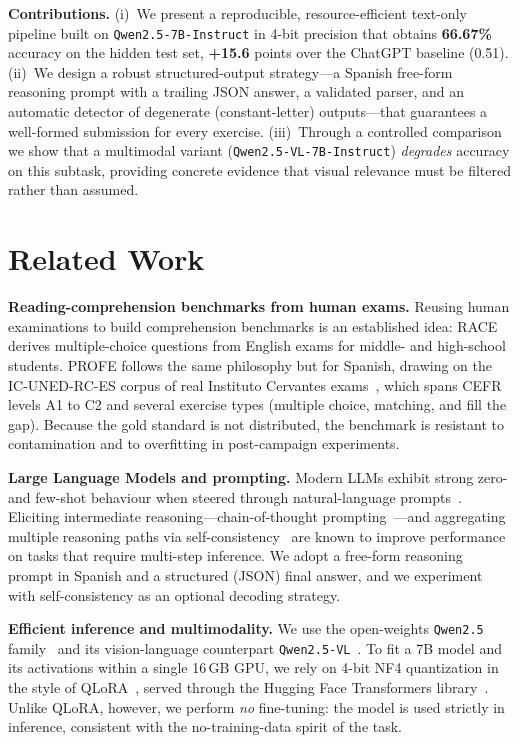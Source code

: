 \documentclass{ceurart}   %
\begin{document}
\noindent\textbf{Contributions.}
(i)~We present a reproducible, resource-efficient text-only pipeline built on
\texttt{Qwen2.5-7B-Instruct} in 4-bit precision that obtains
\textbf{66.67\%} accuracy on the hidden test set, \textbf{+15.6} points over
the ChatGPT baseline (0.51).
(ii)~We design a robust structured-output strategy---a Spanish free-form
reasoning prompt with a trailing JSON answer, a validated parser, and an
automatic detector of degenerate (constant-letter) outputs---that guarantees
a well-formed submission for every exercise.
(iii)~Through a controlled comparison we show that a multimodal variant
(\texttt{Qwen2.5-VL-7B-Instruct}) \emph{degrades} accuracy on this subtask,
providing concrete evidence that visual relevance must be filtered rather
than assumed.

\section{Related Work}
\textbf{Reading-comprehension benchmarks from human exams.}
Reusing human examinations to build comprehension benchmarks is an
established idea: RACE~\cite{lai2017race} derives multiple-choice questions
from English exams for middle- and high-school students. PROFE follows the
same philosophy but for Spanish, drawing on the IC-UNED-RC-ES corpus of real
Instituto Cervantes exams~\cite{penas2026profe}, which spans CEFR levels A1
to C2 and several exercise types (multiple choice, matching, and fill the
gap). Because the gold standard is not distributed, the benchmark is
resistant to contamination and to overfitting in post-campaign experiments.

\textbf{Large Language Models and prompting.}
Modern LLMs exhibit strong zero- and few-shot behaviour when steered through
natural-language prompts~\cite{brown2020gpt3,liu2021prompt,zhao2023survey}.
Eliciting intermediate reasoning---chain-of-thought
prompting~\cite{wei2022cot}---and aggregating multiple reasoning paths via
self-consistency~\cite{wang2023selfconsistency} are known to improve
performance on tasks that require multi-step inference. We adopt a free-form
reasoning prompt in Spanish and a structured (JSON) final answer, and we
experiment with self-consistency as an optional decoding strategy.

\textbf{Efficient inference and multimodality.}
We use the open-weights \texttt{Qwen2.5} family~\cite{qwen25} and its
vision-language counterpart \texttt{Qwen2.5-VL}~\cite{qwen25vl}. To fit a 7B
model and its activations within a single 16\,GB GPU, we rely on 4-bit
NF4 quantization in the style of QLoRA~\cite{dettmers2023qlora}, served
through the Hugging Face Transformers library~\cite{wolf2020transformers}.
Unlike QLoRA, however, we perform \emph{no} fine-tuning: the model is used
strictly in inference, consistent with the no-training-data spirit of the
task.
\end{document}
